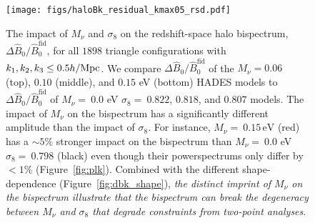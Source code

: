 \documentclass[12pt, letterpaper, preprint]{aastex62}
\newcommand{\smnu}{M_\nu}
\newcommand{\sig}{\sigma_8}
\newcommand{\BOk}{\widehat{B}_0}
\begin{document}
\begin{figure}
\begin{center}
\texttt{[image: figs/haloBk\_residual\_kmax05\_rsd.pdf]}
    \caption{The impact of $\smnu$ and $\sig$ on the redshift-space halo bispectrum,
    $\Delta \BOk/\BOk^\mathrm{fid}$, for all $1898$ triangle configurations with 
    $k_1, k_2, k_3 \leq 0.5 h/{\rm Mpc}$. We compare $\Delta \BOk/\BOk^\mathrm{fid}$ 
    of the $\smnu = 0.06$ (top), $0.10$ (middle), and $0.15$ eV (bottom) HADES models
    to $\Delta \BOk/\BOk^\mathrm{fid}$ of $\smnu{=}~0.0$ eV $\sig{=}~0.822$, $0.818$, and 
    $0.807$ models. The impact of $\smnu$ on the bispectrum has a significantly different 
    amplitude than the impact of $\sig$. For instance, $\smnu{=}~0.15\,\mathrm{eV}$ (red) 
    has a $\sim 5\%$ stronger impact on the bispectrum than $\smnu{=}~0.0$ eV  
    $\sig{=}~0.798$ (black) even though their powerspectrums only differ by $< 1\%$ 
    (Figure~\ref{fig:plk}). Combined with the different shape-dependence (Figure~\ref{fig:dbk_shape}), 
    {\em the distinct imprint of $\smnu$ on the bispectrum illustrate that the bispectrum 
    can break the degeneracy between $\smnu$ and $\sig$ 
    that degrade constraints from two-point analyses}.
    }
\label{fig:dbk_amp}
\end{center}
\end{figure}

\end{document}
